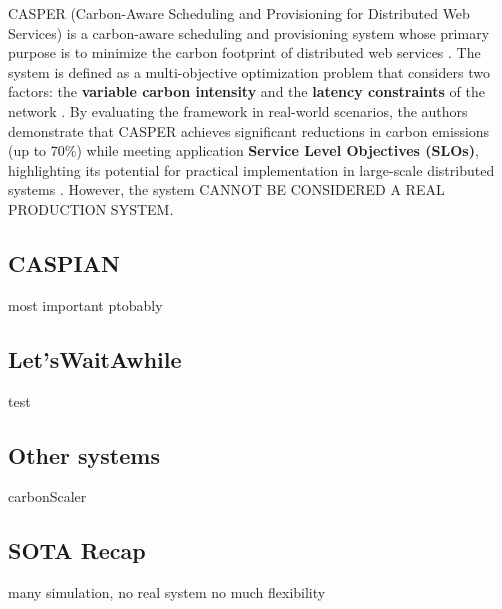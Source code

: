 CASPER (Carbon-Aware Scheduling and Provisioning for Distributed Web Services) is a carbon-aware scheduling and provisioning system whose primary purpose is to minimize the carbon footprint of distributed web services \cite{Souza_2023}.
The system is defined as a multi-objective optimization problem that considers two factors: the \textbf{variable carbon intensity} and the \textbf{latency constraints} of the network \cite{Souza_2023}.
By evaluating the framework in real-world scenarios, the authors demonstrate that CASPER achieves significant reductions in carbon emissions (up to 70\%) while meeting application \textbf{Service Level Objectives (SLOs)}, highlighting its potential for practical implementation in large-scale distributed systems \cite{Souza_2023}. However, the system CANNOT BE CONSIDERED A REAL PRODUCTION SYSTEM.




\subsection{CASPIAN}

most important ptobably

\subsection{Let'sWaitAwhile}

test

\subsection{Other systems}

carbonScaler




\subsection{SOTA Recap}

many simulation, no real system
no much flexibility






\newpage

